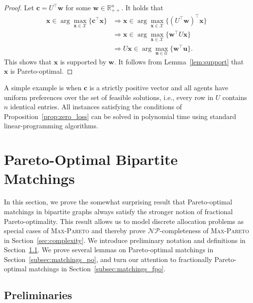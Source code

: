 \documentclass[a4paper, 11pt]{article}
\newcommand{\mc}{\mathcal}
\begin{document}
\begin{proof}
Let $\bm{c} = U^\top \bm{w}$ for some $\bm{w} \in \mathbb{R}_{++}^{n}$. It holds that 
\begin{displaymath}
\begin{aligned}
\bm{x} \in \arg \max\limits_{\bm{x} \in \mc{X}} \{ \bm{c}^\top \bm{x}\} & \Rightarrow \bm{x} \in \arg \max\limits_{\bm{x} \in \mc{X}} \{(U^\top \bm{w})^\top \bm{x}\} \\
& \Rightarrow \bm{x} \in \arg \max\limits_{\bm{x} \in \mc{X}} \{ \bm{w}^\top U \bm{x}\} \\
& \Rightarrow U \bm{x} \in \arg \max\limits_{\bm{u} \in \mc{U}} \{ \bm{w}^\top \bm{u}\}.
\end{aligned}
\end{displaymath}
This shows that $\bm{x}$ is supported by $\bm{w}$. It follows from Lemma~\ref{lem:support} that $\bm{x}$ is Pareto-optimal.
\end{proof}
A simple example is when $\bm{c}$ is a strictly positive vector and all agents have uniform preferences over the set of feasible solutions, i.e., every row in $U$ contains $n$ identical entries. All instances satisfying the conditions of Proposition~\ref{prop:zero_loss} can be solved in polynomial time using standard linear-programming algorithms.

\section{Pareto-Optimal Bipartite Matchings}
\label{sec:matchings}

In this section, we prove the somewhat surprising result that Pareto-optimal matchings in bipartite graphs always satisfy the stronger notion of fractional Pareto-optimality. This result allows us to model discrete allocation problems as special cases of \textsc{Max-Pareto} and thereby prove $\mc{NP}$-completeness of \textsc{Max-Pareto} in Section~\ref{sec:complexity}. We introduce preliminary notation and definitions in Section~\ref{subsec:matchings_preliminary}. We prove several lemmas on Pareto-optimal matchings in Section~\ref{subsec:matchings_po}, and turn our attention to fractionally Pareto-optimal matchings in Section~\ref{subsec:matchings_fpo}.

\subsection{Preliminaries}
\label{subsec:matchings_preliminary}
\end{document}

